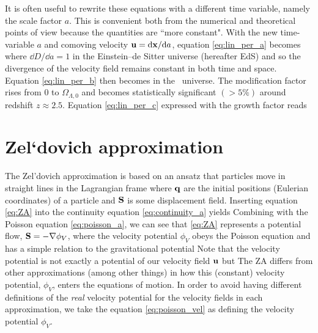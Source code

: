 It is often useful to rewrite these equations with a different time variable, namely the scale factor $a$. This is convenient both from the numerical and theoretical points of view because the quantities are ``more constant". With the new time-variable $a$ and comoving velocity $\mathbf u = \mbox{d} \mathbf x/\mbox{d} a$, equation \eqref{eq:lin_per_a} becomes
where $\dd D/\dd a = 1$ in the Einstein--de Sitter universe (hereafter EdS) and so the divergence of the velocity field remains constant in both time and space. Equation \eqref{eq:lin_per_b} then becomes
in the \LCDM\ universe. The modification factor
rises from $0$ to $\Omega_{\Lambda,0}$ and becomes statistically significant $(>5\%)$ around redshift $z\approx2.5$. Equation \eqref{eq:lin_per_c} expressed with the growth factor reads
\section{Zel`dovich approximation}
The Zel'dovich approximation \parencite[hereafter ZA;][]{1970A&A.....5...84Z} is based on an ansatz that particles move in straight lines in the Lagrangian frame
where $\mathbf q$ are the initial positions (Eulerian coordinates) of a particle and $\mathbf S$ is some displacement field. Inserting equation \eqref{eq:ZA} into the continuity equation \eqref{eq:continuity_a} yields
Combining with the Poisson equation \eqref{eq:poisson_a}, we can see that \eqref{eq:ZA} represents a potential flow, $\mathbf S = -\nabla\phi_V$, where the velocity potential $\phi_V$ obeys the Poisson equation
and has a simple relation to the gravitational potential
Note that the velocity potential is not exactly a potential of our velocity field $\mathbf u$ but
The ZA differs from other approximations (among other things) in how this (constant) velocity potential, $\phi_V$, enters the equations of motion. In order to avoid having different definitions of the \textit{real} velocity potential for the velocity fields in each approximation, we take the equation \eqref{eq:poisson_vel} as defining the velocity potential $\phi_V$.

